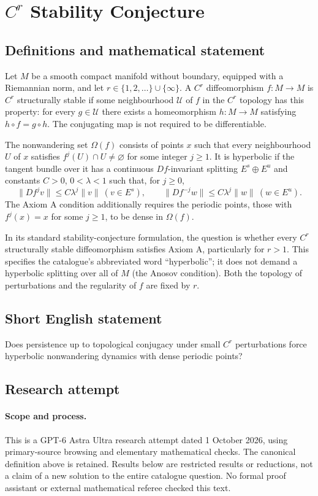 \documentclass[11pt,a4paper]{article}
\begin{document}
\section*{$C^r$ Stability Conjecture}\label{statement}

\subsection{Definitions and mathematical statement}
Let $M$ be a smooth compact manifold without boundary, equipped with a
Riemannian norm, and let $r\in\{1,2,\ldots\}\cup\{\infty\}$.
A $C^r$ diffeomorphism $f:M\to M$ is $C^r$ structurally stable if some
neighbourhood $\mathcal U$ of $f$ in the $C^r$ topology has this property:
for every $g\in\mathcal U$ there exists a homeomorphism $h:M\to M$ satisfying
$h\circ f=g\circ h$. The conjugating map is not required to be differentiable.

The nonwandering set $\Omega(f)$ consists of points $x$ such that every
neighbourhood $U$ of $x$ satisfies $f^j(U)\cap U\ne\varnothing$ for some
integer $j\ge1$. It is hyperbolic if the tangent bundle over it has a continuous
$Df$-invariant splitting $E^s\oplus E^u$ and constants $C>0$, $0<\lambda<1$
such that, for $j\ge0$,
\[
 \|Df^j v\|\le C\lambda^j\|v\|\ (v\in E^s),\qquad
 \|Df^{-j}w\|\le C\lambda^j\|w\|\ (w\in E^u).
\]
The Axiom A condition additionally requires the periodic points, those with
$f^j(x)=x$ for some $j\ge1$, to be dense in $\Omega(f)$.

In its standard stability-conjecture formulation, the question is whether
every $C^r$ structurally stable diffeomorphism satisfies Axiom A, particularly
for $r>1$. This specifies the catalogue's abbreviated word ``hyperbolic'';
it does not demand a hyperbolic splitting over all of $M$ (the Anosov
condition). Both the topology of perturbations and the regularity of $f$
are fixed by $r$.
\subsection{Short English statement}
Does persistence up to topological conjugacy under small $C^r$ perturbations force hyperbolic nonwandering dynamics with dense periodic points?
\subsection{Research attempt}
\paragraph{Scope and process.}
This is a GPT-6 Astra Ultra research attempt dated 1 October 2026, using
primary-source browsing and elementary mathematical checks. The canonical
definition above is retained. Results below are restricted results or
reductions, not a claim of a new solution to the entire catalogue question.
No formal proof assistant or external mathematical referee checked this text.
\end{document}
